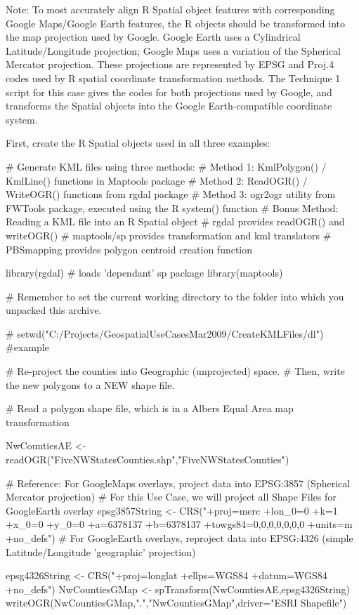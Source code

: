 Note: To most accurately align R Spatial object features with corresponding Google Maps/Google Earth features, the R objects should be transformed into the map projection used by Google. Google Earth uses a Cylindrical Latitude/Longitude projection; Google Maps uses a variation of the Spherical Mercator projection. These projections are represented by EPSG and Proj.4 codes used by R spatial coordinate transformation methods. The Technique 1 script for this case gives the codes for both projections used by Google, and transforms the Spatial objects into the Google Earth-compatible coordinate system.

First, create the R Spatial objects used in all three examples:

# Generate KML files using three methods: 
# Method 1: KmlPolygon() / KmlLine() functions in Maptools package
# Method 2: ReadOGR() / WriteOGR() functions from rgdal package
# Method 3: ogr2ogr utility from FWTools package, executed using the R system() function                     # Bonus Method: Reading a KML file into an R Spatial object 
# rgdal provides readOGR() and writeOGR()
# maptools/sp provides transformation and kml translators
# PBSmapping provides polygon centroid creation function

  library(rgdal)  # loads 'dependant' sp package
  library(maptools)

# Remember to set the current working directory to the folder into which you unpacked this archive.

#  setwd("C:/Projects/GeospatialUseCasesMar2009/CreateKMLFiles/dl") #example

# Re-project the counties into Geographic (unprojected) space.
# Then, write the new polygons to a NEW shape file.

# Read a polygon shape file, which is in a Albers Equal Area map transformation

  NwCountiesAE <- readOGR("FiveNWStatesCounties.shp","FiveNWStatesCounties")

# Reference: For GoogleMaps overlays, project data into EPSG:3857 (Spherical Mercator projection)
# For this Use Case, we will project all Shape Files for GoogleEarth overlay   
  epsg3857String <- CRS("+proj=merc +lon_0=0 +k=1 +x_0=0 +y_0=0 +a=6378137 +b=6378137 +towgs84=0,0,0,0,0,0,0 +units=m +no_defs")   
# For GoogleEarth overlays, reproject data into EPSG:4326 (simple Latitude/Longitude 'geographic' projection)

  epsg4326String <- CRS("+proj=longlat +ellps=WGS84 +datum=WGS84 +no_defs")
  NwCountiesGMap <- spTransform(NwCountiesAE,epsg4326String)
  writeOGR(NwCountiesGMap,".","NwCountiesGMap",driver="ESRI Shapefile")  

